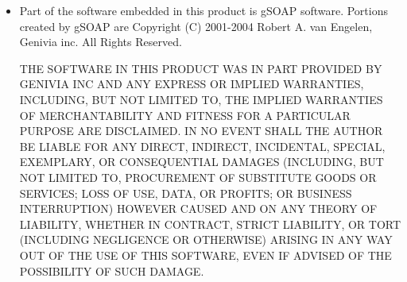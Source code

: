 \begin{itemize}
\item
Part of the software embedded in this product is gSOAP software.
Portions created by gSOAP are Copyright (C) 2001-2004 Robert A. van Engelen, Genivia inc. All Rights Reserved.

THE SOFTWARE IN THIS PRODUCT WAS IN PART PROVIDED BY GENIVIA INC AND ANY EXPRESS OR IMPLIED WARRANTIES, INCLUDING, BUT NOT LIMITED TO, THE IMPLIED WARRANTIES OF MERCHANTABILITY AND FITNESS FOR A PARTICULAR PURPOSE ARE DISCLAIMED. IN NO EVENT SHALL THE AUTHOR BE LIABLE FOR ANY DIRECT, INDIRECT, INCIDENTAL, SPECIAL, EXEMPLARY, OR CONSEQUENTIAL DAMAGES (INCLUDING, BUT NOT LIMITED TO, PROCUREMENT OF SUBSTITUTE GOODS OR SERVICES; LOSS OF USE, DATA, OR PROFITS; OR BUSINESS INTERRUPTION) HOWEVER CAUSED AND ON ANY THEORY OF LIABILITY, WHETHER IN CONTRACT, STRICT LIABILITY, OR TORT (INCLUDING NEGLIGENCE OR OTHERWISE) ARISING IN ANY WAY OUT OF THE USE OF THIS SOFTWARE, EVEN IF ADVISED OF THE POSSIBILITY OF SUCH DAMAGE.
\end{itemize}
